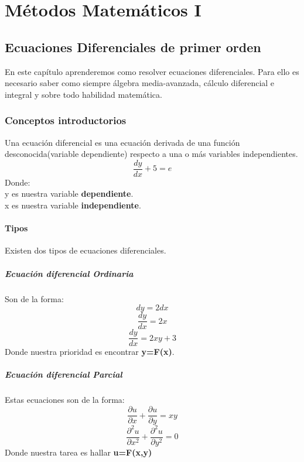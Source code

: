 \documentclass[
	12pt, %
	fleqn, %
	a4paper, %
	oneside, %
]{LegrandOrangeBook}
\begin{document}
\part{Métodos Matemáticos I}
\chapter{Ecuaciones Diferenciales de primer orden}
En este capítulo aprenderemos como resolver ecuaciones diferenciales. Para ello es necesario saber como siempre álgebra media-avanzada, cálculo diferencial e integral y sobre todo habilidad matemática. 
\section{Conceptos introductorios}
Una ecuación diferencial es una ecuación derivada de una función desconocida(variable dependiente) respecto a una o más variables independientes.
\begin{displaymath}
\frac{dy}{dx}+5=e
\end{displaymath}
Donde:\\
y es nuestra variable \textbf{dependiente}.\\
x es nuestra variable \textbf{independiente}.\\
\subsection{Tipos}
Existen dos tipos de ecuaciones diferenciales.
\subsubsection{Ecuación diferencial Ordinaria}
Son de la forma:
\begin{displaymath}
dy=2dx
\end{displaymath}
\begin{displaymath}
\frac{dy}{dx}=2x
\end{displaymath}
\begin{displaymath}
\frac{dy}{dx}=2xy+3
\end{displaymath}
Donde nuestra prioridad es encontrar \textbf{y=F(x)}.
\subsubsection{Ecuación diferencial Parcial}
Estas ecuaciones son de la forma:
\begin{displaymath}
\frac{\partial u}{\partial x}+\frac{\partial u}{\partial y}=xy
\end{displaymath}
\begin{displaymath}
\frac{\partial ^2u}{\partial x^2}+\frac{\partial ^2u}{\partial y^2}=0
\end{displaymath}
Donde nuestra tarea es hallar \textbf{u=F(x,y)}
\end{document}
